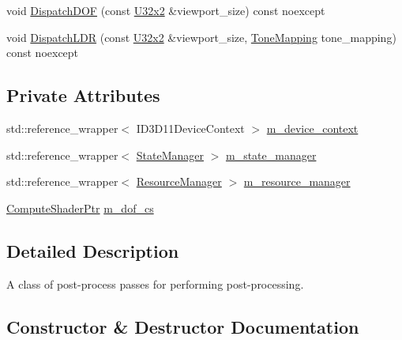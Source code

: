 \begin{DoxyCompactItemize}
\item 
void \mbox{\hyperlink{classmage_1_1rendering_1_1_post_process_pass_a5a580293635c790deb09e958724021c2}{Dispatch\+D\+OF}} (const \mbox{\hyperlink{namespacemage_a31f2bb52b5080e706e1c13de07c0a249}{U32x2}} \&viewport\+\_\+size) const noexcept
\item 
void \mbox{\hyperlink{classmage_1_1rendering_1_1_post_process_pass_a8736c2eb9872035c2e5d109681f72146}{Dispatch\+L\+DR}} (const \mbox{\hyperlink{namespacemage_a31f2bb52b5080e706e1c13de07c0a249}{U32x2}} \&viewport\+\_\+size, \mbox{\hyperlink{namespacemage_1_1rendering_a789e4b7d9a8cc831b065e9c6bb7430e9}{Tone\+Mapping}} tone\+\_\+mapping) const noexcept
\end{DoxyCompactItemize}
\subsection*{Private Attributes}
\begin{DoxyCompactItemize}
\item 
std\+::reference\+\_\+wrapper$<$ I\+D3\+D11\+Device\+Context $>$ \mbox{\hyperlink{classmage_1_1rendering_1_1_post_process_pass_a18468bc4ffa408e9db3089b306f45291}{m\+\_\+device\+\_\+context}}
\item 
std\+::reference\+\_\+wrapper$<$ \mbox{\hyperlink{classmage_1_1rendering_1_1_state_manager}{State\+Manager}} $>$ \mbox{\hyperlink{classmage_1_1rendering_1_1_post_process_pass_a80cbe6aee950e5bcc98763813fdb8aba}{m\+\_\+state\+\_\+manager}}
\item 
std\+::reference\+\_\+wrapper$<$ \mbox{\hyperlink{classmage_1_1rendering_1_1_resource_manager}{Resource\+Manager}} $>$ \mbox{\hyperlink{classmage_1_1rendering_1_1_post_process_pass_af20e46967d28e7e0500fff6b1988ad80}{m\+\_\+resource\+\_\+manager}}
\item 
\mbox{\hyperlink{namespacemage_1_1rendering_ab3dc9f2114f2e9255b91d9c051da52ea}{Compute\+Shader\+Ptr}} \mbox{\hyperlink{classmage_1_1rendering_1_1_post_process_pass_aec72e5a7ca28c11754f85ab6726ce5ec}{m\+\_\+dof\+\_\+cs}}
\end{DoxyCompactItemize}


\subsection{Detailed Description}
A class of post-\/process passes for performing post-\/processing. 

\subsection{Constructor \& Destructor Documentation}
\mbox{\label{classmage_1_1rendering_1_1_post_process_pass_aa7989cc618c40d64e6e86f1aa8576dff}} 
